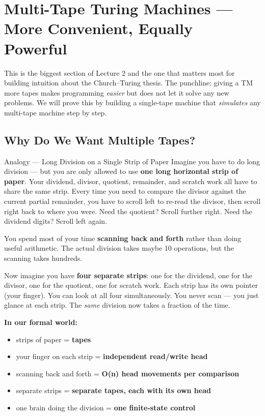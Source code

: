 \section{Multi-Tape Turing Machines --- More Convenient, Equally Powerful}

This is the biggest section of Lecture 2 and the one that matters most for building intuition about the Church--Turing thesis. The punchline: giving a TM more tapes makes programming \textit{easier} but does not let it solve any new problems. We will prove this by building a single-tape machine that \textit{simulates} any multi-tape machine step by step.

\subsection{Why Do We Want Multiple Tapes?}

\begin{notebox}{Analogy --- Long Division on a Single Strip of Paper}
Imagine you have to do long division --- but you are only allowed to use \textbf{one long horizontal strip of paper}. Your dividend, divisor, quotient, remainder, and scratch work all have to share the same strip. Every time you need to compare the divisor against the current partial remainder, you have to scroll left to re-read the divisor, then scroll right back to where you were. Need the quotient? Scroll further right. Need the dividend digits? Scroll left again.

You spend most of your time \textbf{scanning back and forth} rather than doing useful arithmetic. The actual division takes maybe 10 operations, but the scanning takes hundreds.

Now imagine you have \textbf{four separate strips}: one for the dividend, one for the divisor, one for the quotient, one for scratch work. Each strip has its own pointer (your finger). You can look at all four simultaneously. You never scan --- you just glance at each strip. The \textit{same} division now takes a fraction of the time.

\textbf{In our formal world:}
\begin{itemize}[nosep]
\item strips of paper = \textbf{tapes}
\item your finger on each strip = \textbf{independent read/write head}
\item scanning back and forth = \textbf{O(n) head movements per comparison}
\item separate strips = \textbf{separate tapes, each with its own head}
\item one brain doing the division = \textbf{one finite-state control}
\end{itemize}
\end{notebox}

